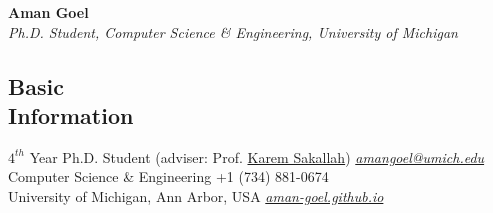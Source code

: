 \documentclass[margin,line,letter]{resume}
\begin{document}
\thispagestyle{empty}
{\sc \LARGE \phantom{xx}\hspace{25ex} \textbf{Aman Goel} 
\vspace{0.3cm}
\\
\large \emph{\phantom{xx}\hspace{11ex} Ph.D. Student, Computer Science \& Engineering, University of Michigan}}
\begin{resume}
    

\section{\mysidestyle Basic\\Information}
    $4^{th}$ Year Ph.D. Student (adviser: Prof. \href{http://web.eecs.umich.edu/~karem/}{Karem Sakallah})                       \hfill \href{mailto:amangoel@umich.edu}{\textit{amangoel@umich.edu}} \phantom{xx}\hspace{1ex} \faEnvelope \\
    Computer Science \& Engineering 
     \hfill +1 (734) 881-0674 \phantom{xx}\hspace{1ex} \faPhone \\
    University of Michigan, Ann Arbor, USA      \hfill \href{https://aman-goel.github.io/}{\textit{aman-goel.github.io}} \phantom{xx}\hspace{1ex} \faExternalLink
    


\end{resume}
\end{document}
